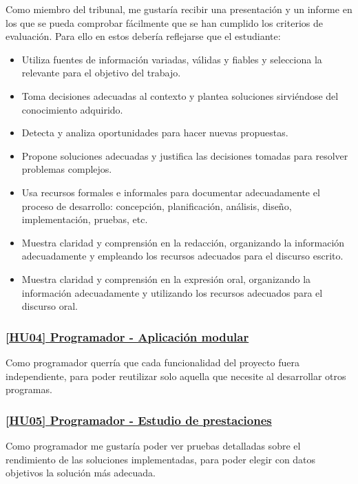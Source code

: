 Como miembro del tribunal, me gustaría recibir una presentación y un informe en los que se pueda comprobar fácilmente que se han cumplido los criterios de evaluación. Para ello en estos debería reflejarse que el estudiante:
\begin{itemize}
	\item{Utiliza fuentes de información variadas, válidas y fiables y selecciona la relevante para el objetivo del trabajo.}
    \item{Toma decisiones adecuadas al contexto y plantea soluciones sirviéndose del conocimiento adquirido.}
    \item{Detecta y analiza oportunidades para hacer nuevas propuestas.}
    \item{Propone soluciones adecuadas y justifica las decisiones tomadas para resolver problemas complejos.}
    \item{Usa recursos formales e informales para documentar adecuadamente el proceso de desarrollo: concepción, planificación, análisis, diseño, implementación, pruebas, etc.}
    \item{Muestra claridad y comprensión en la redacción, organizando la información adecuadamente y empleando los recursos adecuados para el discurso escrito.}
    \item{Muestra claridad y comprensión en la expresión oral, organizando la información adecuadamente y utilizando los recursos adecuados para el discurso oral.}
\end{itemize}


\subsubsection*{\href{https://github.com/dipzza/ultrastar-song2txt/issues/10}{[HU04] Programador - Aplicación modular}}

Como programador querría que cada funcionalidad del proyecto fuera independiente, para poder reutilizar solo aquella que necesite al desarrollar otros programas.

\subsubsection*{\href{https://github.com/dipzza/ultrastar-song2txt/issues/11}{[HU05] Programador - Estudio de prestaciones}}

Como programador me gustaría poder ver pruebas detalladas sobre el rendimiento de las soluciones implementadas, para poder elegir con datos objetivos la solución más adecuada.


